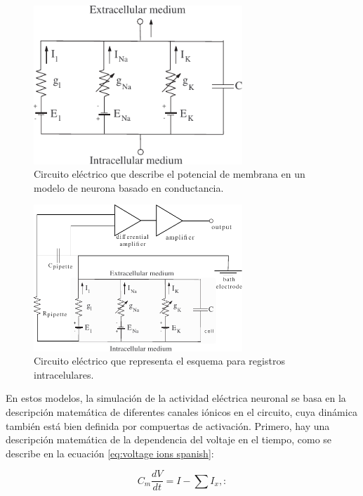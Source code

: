 \begin{figure}[htb!]
\centering
\includegraphics[width=0.7\textwidth]{./img/intro/electrical_circuit.pdf}
\caption{Circuito eléctrico que describe el potencial de membrana en un modelo de neurona basado en conductancia.}
\label{fig:electrical circuit spanish}
\end{figure}

\begin{figure}[htb!]
\centering
\includegraphics[width=0.7\textwidth]{./img/intro/intracellular_recording_circuit.pdf}
\caption{Circuito eléctrico que representa el esquema para registros intracelulares.}
\label{fig:clamp circuit spanish}
\end{figure}

En estos modelos, la simulación de la actividad eléctrica neuronal se basa en la descripción matemática de diferentes canales iónicos en el circuito, cuya dinámica también está bien definida por compuertas de activación. Primero, hay una descripción matemática de la dependencia del voltaje en el tiempo, como se describe en la ecuación \ref{eq:voltage ions spanish}:

\begin{equation}
C_m \frac{dV}{dt} = I - \sum I_{x},
\label{eq:voltage ions spanish}:
\end{equation}

